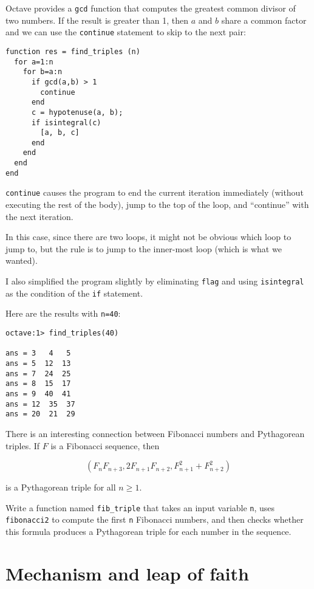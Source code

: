 Octave provides a {\tt gcd} function that computes the greatest common
divisor of two numbers. If the result is greater than 1, then
$a$ and $b$ share a common factor and we can use the {\tt continue}
statement to skip to the next pair:

\begin{verbatim}
function res = find_triples (n)
  for a=1:n
    for b=a:n
      if gcd(a,b) > 1
        continue
      end
      c = hypotenuse(a, b);
      if isintegral(c)
        [a, b, c]
      end
    end
  end
end
\end{verbatim}

{\tt continue} causes the program to end the current iteration
immediately (without executing the rest of the body), jump to
the top of the loop, and ``continue'' with the next iteration.

In this case, since there are two loops, it might not be obvious
which loop to jump to, but the rule is to jump to the inner-most
loop (which is what we wanted).

I also simplified the program slightly by eliminating
{\tt flag} and using {\tt isintegral} as the condition of the
{\tt if} statement.

Here are the results with {\tt n=40}:

\begin{verbatim}
octave:1> find_triples(40)

ans = 3   4   5
ans = 5  12  13
ans = 7  24  25
ans = 8  15  17
ans = 9  40  41
ans = 12  35  37
ans = 20  21  29
\end{verbatim}

There is an interesting connection between Fibonacci numbers and
Pythagorean triples. If $F$ is a Fibonacci sequence, then

\[ (F_n F_{n+3}, 2 F_{n+1} F_{n+2}, F_{n+1}^2 + F_{n+2}^2 ) \]

is a Pythagorean triple for all $n \ge 1$.

\begin{ex}
Write a function named {\tt fib\_triple} that
takes an input variable {\tt n}, uses {\tt fibonacci2} to compute
the first {\tt n} Fibonacci numbers, and then checks whether 
this formula produces a Pythagorean triple for each number
in the sequence.
\end{ex}



\section{Mechanism and leap of faith}

